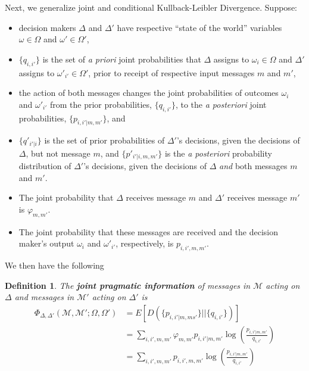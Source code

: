 \documentclass[11pt]{article}
\newtheorem*{definition}{Definition}
\begin{document}
Next, we generalize joint and conditional Kullback-Leibler Divergence.  Suppose:

\begin{itemize}
\item decision makers $\Delta$ and $\Delta'$ have respective ``state of the world'' variables $\omega \in \Omega$ and $\omega' \in \Omega'$,  
\item $\{q_{i,i'}\}$ is the set of {\it a priori} joint probabilities that $\Delta$ assigns to $\omega_i \in \Omega$ and $\Delta'$ assigns to $\omega'_{i'} \in \Omega'$, prior to receipt of respective input messages $m$ and $m'$,
\item the action of both messages changes the joint probabilities of outcomes $\omega_i$ and $\omega'_{i'}$ from the prior probabilities, $\{q_{i,i'}\}$, to the {\it a posteriori} joint probabilities, $\{p_{i,i'|m, m'}\}$, and 
\item $\{q'_{i'|i}\}$ is the set of prior probabilities of $\Delta'$'s decisions, given the decisions of $\Delta$, but not message $m$, and $\{p'_{i'|i,m,m'}\}$ is the {\it a posteriori} probability distribution of $\Delta'$'s decisions, given the decisions of $\Delta$ {\it and} both messages $m$ and $m'$.  
\item The joint probability that $\Delta$ receives message $m$ and $\Delta'$ receives message $m'$ is $\varphi_{m, m'}$.
\item The joint probability that these messages are received and the decision maker's output $\omega_i$ and $\omega'_{i'}$, respectively, is $p_{i, i', m, m'}$.  
\end{itemize}
We then have the following
\begin{definition}
The {\bf joint pragmatic information} of messages in ${\mathcal M}$ acting on $\Delta$ and messages in ${\mathcal M'}$ acting on $\Delta'$ is
\begin{align*}
\Phi_{\Delta, \Delta'} (\mathcal M, \mathcal M'; \Omega, \Omega') &= E \left[ D(\{p_{i,i'|m, ms'}\} || \{q_{i,i'}\}) \right] \\
                                     &= \sum_{i, i', m, m'} \varphi_{m, m'}  p_{i, i'|m, m'} \log \left(\frac{p_{i,i'|m, m'}}{q_{i,i'}}\right)\\                                 
                                     &= \sum_{i, i', m, m'} p_{i, i', m, m'} \log \left(\frac{p_{i,i'|m, m'}}{q_{i,i'}}\right)  \\
\end{align*}
\end{definition}
\end{document}
